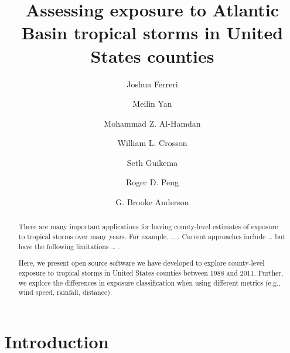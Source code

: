 \documentclass[]{elsarticle} %
\begin{document}
\begin{frontmatter}

  \title{Assessing exposure to Atlantic Basin tropical storms in United States
counties}
    \author[Colorado State University]{Joshua Ferreri}
  
    \author[Colorado State University]{Meilin Yan}
  
    \author[NASA Marshall Space Flight Center]{Mohammad Z. Al-Hamdan}
  
    \author[NASA Marshall Space Flight Center]{William L. Crosson}
  
    \author[University of Michigan]{Seth Guikema}
  
    \author[Johns Hopkins Bloomberg School of Public Health]{Roger D. Peng}
  
    \author[Colorado State University]{G. Brooke Anderson}
      \address[Colorado State University]{Department of Environmental and Radiological Health Sciences, Lake
Street, Fort Collins, CO, Zip}
    \address[NASA Marshall Space Flight Center]{Universities Space Research Association, 320 Sparkman Dr., Huntsville,
AL, 35805}
    \address[University of Michigan]{Department of Industrial and Operations Engineering, 1205 Beal Ave., Ann
Arbor, MI, 48109}
    \address[Johns Hopkins Bloomberg School of Public Health]{Department of Biostatistics, 615 North Wolfe Street, Baltimore, MD,
21205}
  
  \begin{abstract}
  There are many important applications for having county-level estimates
  of exposure to tropical storms over many years. For example, \ldots{} .
  Current approaches include \ldots{} but have the following limitations
  \ldots{} .
  
  Here, we present open source software we have developed to explore
  county-level exposure to tropical storms in United States counties
  between 1988 and 2011. Further, we explore the differences in exposure
  classification when using different metrics (e.g., wind speed, rainfall,
  distance).
  \end{abstract}
  
 \end{frontmatter}

\section{Introduction}\label{introduction}
\end{document}
